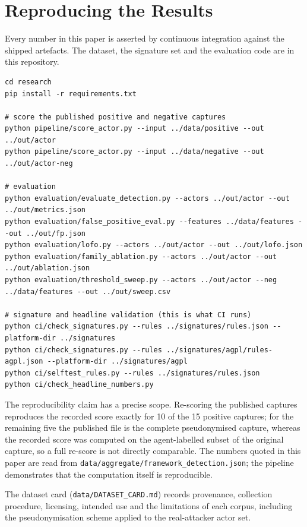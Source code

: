 \documentclass[11pt]{article}
\begin{document}
\section{Reproducing the Results}
\label{sec:repro}

Every number in this paper is asserted by continuous integration against the shipped
artefacts. The dataset, the signature set and the evaluation code are in this repository.

\begin{lstlisting}
cd research
pip install -r requirements.txt

# score the published positive and negative captures
python pipeline/score_actor.py --input ../data/positive --out ../out/actor
python pipeline/score_actor.py --input ../data/negative --out ../out/actor-neg

# evaluation
python evaluation/evaluate_detection.py --actors ../out/actor --out ../out/metrics.json
python evaluation/false_positive_eval.py --features ../data/features --out ../out/fp.json
python evaluation/lofo.py --actors ../out/actor --out ../out/lofo.json
python evaluation/family_ablation.py --actors ../out/actor --out ../out/ablation.json
python evaluation/threshold_sweep.py --actors ../out/actor --neg ../data/features --out ../out/sweep.csv

# signature and headline validation (this is what CI runs)
python ci/check_signatures.py --rules ../signatures/rules.json --platform-dir ../signatures
python ci/check_signatures.py --rules ../signatures/agpl/rules-agpl.json --platform-dir ../signatures/agpl
python ci/selftest_rules.py --rules ../signatures/rules.json
python ci/check_headline_numbers.py
\end{lstlisting}

The reproducibility claim has a precise scope. Re-scoring the published captures reproduces the
recorded score exactly for 10 of the 15 positive captures; for the remaining five the published
file is the complete pseudonymised capture, whereas the recorded score was computed on the
agent-labelled subset of the original capture, so a full re-score is not directly comparable.
The numbers quoted in this paper are read from
\texttt{data/aggregate/framework\_detection.json}; the pipeline demonstrates that the
computation itself is reproducible.

The dataset card (\texttt{data/DATASET\_CARD.md}) records provenance, collection procedure,
licensing, intended use and the limitations of each corpus, including the pseudonymisation
scheme applied to the real-attacker actor set.
\end{document}
